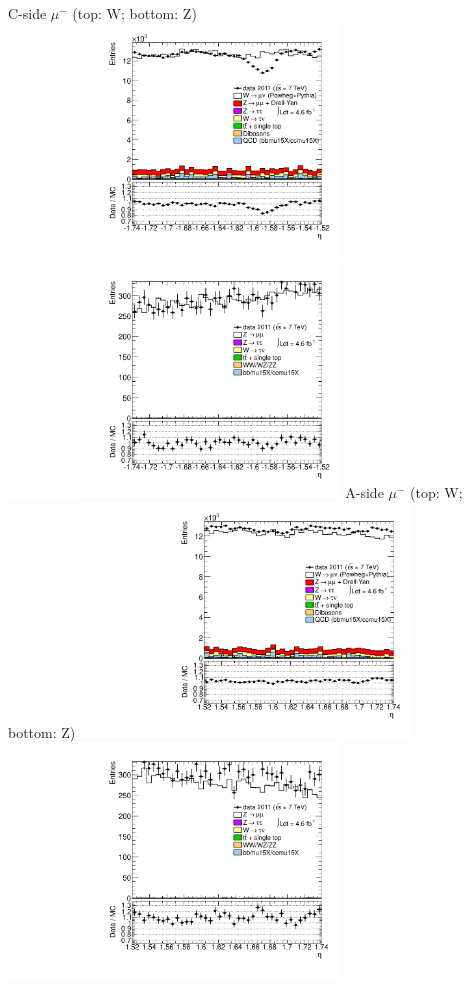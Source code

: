  {
\colb[T]
C-side $\mu^{-}$ (top: W; bottom: Z)
\centering
\includegraphics[width=0.66\textwidth]{dates/20130306/figures/both/W_8_C_stack_l_eta_POS} \\
\includegraphics[width=0.66\textwidth]{dates/20130306/figures/both/Ztinv_8_C_stack_lP_eta_ALL.pdf}
A-side $\mu^{-}$ (top: W; bottom: Z)
\centering
\includegraphics[width=0.66\textwidth]{dates/20130306/figures/both/W_8_A_stack_l_eta_POS} \\
\includegraphics[width=0.66\textwidth]{dates/20130306/figures/both/Ztinv_8_A_stack_lP_eta_ALL.pdf} 
\cole
}

